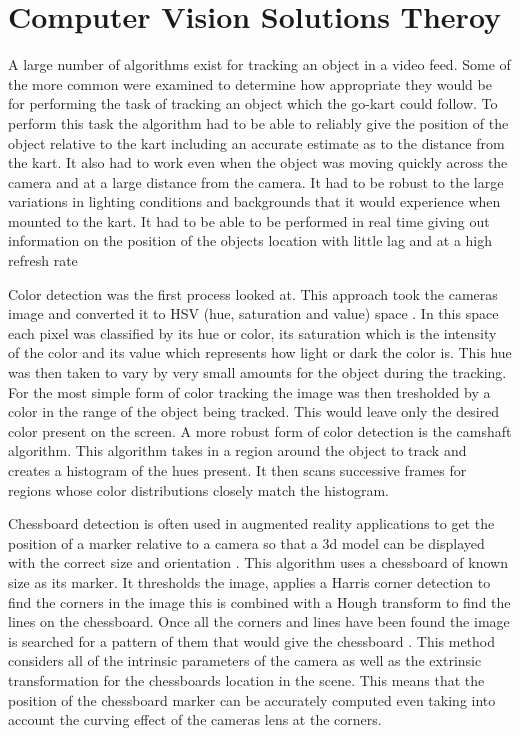\section{Computer Vision Solutions Theroy}

A large number of algorithms exist for tracking an object in a video feed. Some of the more common were examined to determine how appropriate they would be for performing the task of tracking an object which the go-kart could follow. To perform this task the algorithm had to be able to reliably give the position of the object relative to the kart including an accurate estimate as to the distance from the kart. It also had to work even when the object was moving quickly across the camera and at a large distance from the camera. It had to be robust to the large variations in lighting conditions and backgrounds that it would experience when mounted to the kart. It had to be able to be performed in real time giving out information on the position of the objects location with little lag and at a high refresh rate

Color detection was the first process looked at. This approach took the cameras image and converted it to HSV (hue, saturation and value) space \cite{hsv}. In this space each pixel was classified by its hue or color, its saturation which is the intensity of the color and its value which represents how light or dark the color is. This hue was then taken to vary by very small amounts  for the object during the tracking. For the most simple form of color tracking the image was then tresholded by a color in the range of the object being tracked. This would leave only the desired color present on the screen. A more robust form of color detection is the camshaft algorithm. This algorithm takes in a region around the object to track and creates a histogram of the hues present. It then scans successive frames for regions whose color distributions closely match the histogram.  

Chessboard detection is often used in augmented reality applications to get the position of a marker relative to a camera so that a 3d model can be displayed with the correct size and orientation \cite{augmented}. This algorithm uses a chessboard of known size as its marker. It thresholds the image, applies a Harris corner detection to find the corners in the image this is combined with a Hough transform to find the lines on the chessboard. Once all the corners and lines have been found the image is searched for a pattern of them that would give the chessboard \cite{chessboard}. This method considers all of the intrinsic parameters of the camera as well as the extrinsic transformation for the chessboards location in the scene. This means that the position of the chessboard marker can be accurately computed even taking into  account the curving effect of the cameras lens at the corners. 

